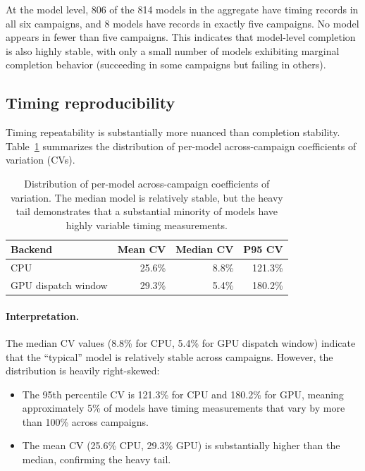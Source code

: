 \documentclass[10pt,twocolumn,letterpaper]{article}
\begin{document}
At the model level, 806 of the 814 models in the aggregate have timing records in all six campaigns, and 8 models have records in exactly five campaigns. No model appears in fewer than five campaigns. This indicates that model-level completion is also highly stable, with only a small number of models exhibiting marginal completion behavior (succeeding in some campaigns but failing in others).

\subsection{Timing reproducibility}

Timing repeatability is substantially more nuanced than completion stability. Table~\ref{tab:reproducibility} summarizes the distribution of per-model across-campaign coefficients of variation (CVs).

\begin{table}[t]
\centering\small
\begin{tabular}{lrrr}
\toprule
Backend & Mean CV & Median CV & P95 CV \\
\midrule
CPU & 25.6\% & 8.8\% & 121.3\% \\
GPU dispatch window & 29.3\% & 5.4\% & 180.2\% \\
\bottomrule
\end{tabular}
\caption{Distribution of per-model across-campaign coefficients of variation. The median model is relatively stable, but the heavy tail demonstrates that a substantial minority of models have highly variable timing measurements.}
\label{tab:reproducibility}
\end{table}

\paragraph{Interpretation.}
The median CV values (8.8\% for CPU, 5.4\% for GPU dispatch window) indicate that the ``typical'' model is relatively stable across campaigns. However, the distribution is heavily right-skewed:
\begin{itemize}[nosep,leftmargin=*]
  \item The 95th percentile CV is 121.3\% for CPU and 180.2\% for GPU, meaning approximately 5\% of models have timing measurements that vary by more than 100\% across campaigns.
  \item The mean CV (25.6\% CPU, 29.3\% GPU) is substantially higher than the median, confirming the heavy tail.
\end{itemize}
\end{document}
